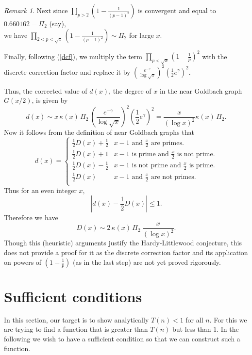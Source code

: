 \documentclass[11pt]{article}
\theoremstyle{definition}
\theoremstyle{remark}
\newtheorem{remark}[theorem]{Remark}
\numberwithin{equation}{section}
\begin{document}
\begin{remark}
\vspace{1em}
\noindent
Next since $\prod\limits_{p>2} \left( 1-\frac{1}{(p-1)^2}\right)$ is convergent and equal to $0.660162=\Pi_2$ (say),\\[1em]
we have $\prod\limits_{2<p< \sqrt{x}} \left( 1-\frac{1}{(p-1)^2}\right)\sim \Pi_2$ for large $x$. 

\vspace{1em}
\noindent
Finally, following (\ref{dcf}), we multiply the term $\prod\limits_{p< \sqrt{x}} \left( 1-\frac{1}{p}\right)^2$ with the discrete correction factor and replace it by $\left(\frac{e^{-\gamma}}{\log \sqrt{x}}\right)^2 \left(\frac{1}{2} e^{\gamma}\right)^2$. 

\vspace{1em}
\noindent
Thus, the corrected value of $d(x)$, the degree of $x$ in the near Goldbach graph $G(x/2)$, is given by 
$$d(x)\sim x\, \kappa(x)\,\Pi_2\ \left(\frac{e^{-\gamma}}{\log \sqrt{x}}\right)^2 \left(\frac{1}{2} e^{\gamma}\right)^2=\frac{x}{(\log x)^2} \kappa(x)\, \Pi_2.$$
Now it follows from the definition of near Goldbach graphs that 
$$d(x)=\left\{%
\begin{array}{ll}
\frac{1}{2} D(x)+\frac{1}{2} & x-1 \text{ and }\frac{x}{2}\text{ are primes}.\\
\frac{1}{2} D(x)+1 & x-1 \text{ is prime and }\frac{x}{2}\text{ is not prime}.\\
\frac{1}{2} D(x)-\frac{1}{2} & x-1 \text{ is not prime and }\frac{x}{2}\text{ is prime}.\\
\frac{1}{2} D(x) & x-1 \text{ and }\frac{x}{2}\text{ are not primes}.\\
\end{array}\right.$$
Thus for an even integer $x$,
$$|d(x)- \frac{1}{2} D(x)|\leq 1.$$
Therefore we have
$$D(x)\sim 2\,\kappa(x)\,\Pi_2\ \frac{x}{(\log x)^2}.$$
Though this (heuristic) arguments justify the Hardy-Littlewood conjecture, this does not provide a proof for it as the discrete correction factor and its application on powers of $\left(1-\frac{1}{p}\right)$ (as in the last step) are not yet proved rigorously.
\end{remark}

\section{Sufficient conditions}

\noindent
In this section, our target is to show analytically $T(n)<1$ for all $n$. For this we are trying to find a function that is greater than $T(n)$ but less than $1$. In the following we wish to have a sufficient condition so that we can construct such a function.  
\end{document}
